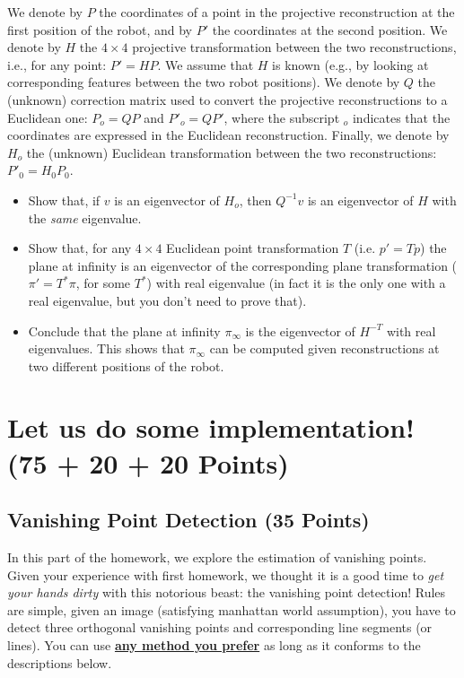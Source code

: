 \documentclass[11pt]{article}
\begin{document}
We denote by $P$ the coordinates of a point in the projective reconstruction at the first position of the robot, and 
by $P'$ the coordinates at the second position. We denote by $H$ the $4 \times 4$ projective transformation between the 
two reconstructions, i.e., for any point: $P' = HP$. We assume that $H$ is known (e.g., by looking at corresponding features 
between the two robot positions). We denote by $Q$ the (unknown) correction matrix used to convert the projective 
reconstructions to a Euclidean one: $P_o = QP$ and $P'_o = QP'$, where the subscript $_o$ indicates that the coordinates
are expressed in the Euclidean reconstruction. Finally, we denote by $H_o$ the (unknown) Euclidean transformation 
between the two reconstructions: $P'_0=H_0P_0$.

\begin{itemize}

\item Show that, if $v$ is an eigenvector of $H_o$, then $Q^{-1}v$ is an eigenvector of $H$ with the {\em same} eigenvalue.
\item Show that, for any $4 \times 4$ Euclidean point transformation $T$ (i.e. $p' = Tp$) the plane at infinity is an eigenvector of 
the corresponding plane transformation ($\pi' = T^*\pi$, for some $T^*$) with real eigenvalue
 (in fact it is the only one with a real eigenvalue, but you don't need to prove that).
\item Conclude that the plane at infinity $\pi_\infty$ is the eigenvector of $H^{-T}$ with real eigenvalues.
This shows that $\pi_\infty$ can be computed given reconstructions at two different positions of the robot.

\end{itemize}


\section{Let us do some implementation! (75  + 20 + 20 Points)}
\subsection{Vanishing Point Detection (35 Points)}
\label{vp}

In this part of the homework, we explore the estimation of vanishing points. Given your experience with first homework, we thought it is a good time to {\it get your hands dirty} with this notorious beast: the vanishing point detection!  Rules are simple, given an image (satisfying manhattan world assumption), you have to detect three orthogonal vanishing points and corresponding line segments (or lines). You can use \underline{{\bf any method you prefer}} as long as it conforms to the descriptions below.
\end{document}
